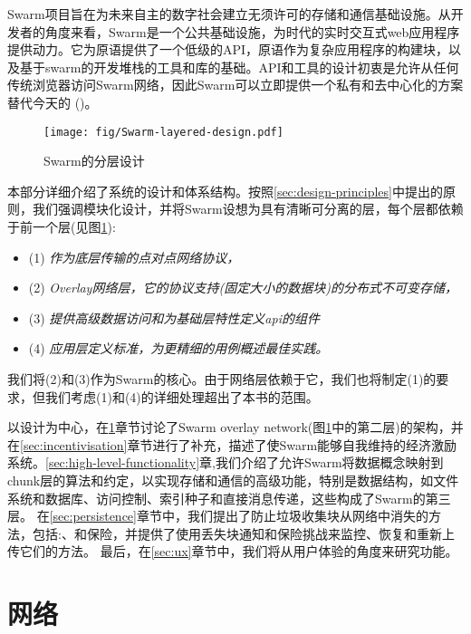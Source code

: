 
\green{}

Swarm项目旨在为未来自主的数字社会建立无须许可的存储和通信基础设施。从开发者的角度来看，Swarm是一个公共基础设施，为时代的实时交互式web应用程序提供动力。它为原语提供了一个低级的API，原语作为复杂应用程序的构建块，以及基于swarm的开发堆栈的工具和库的基础。API和工具的设计初衷是允许从任何传统浏览器访问Swarm网络，因此Swarm可以立即提供一个私有和去中心化的方案替代今天的 ()。

\begin{figure}[htbp]
  \centering
    \texttt{[image: fig/Swarm-layered-design.pdf]}
  \caption[Swarm的分层设计\statusgreen]{Swarm的分层设计}
\label{fig:Swarm-layered-design}
\end{figure}

本部分详细介绍了系统的设计和体系结构。按照\ref{sec:design-principles}中提出的原则，我们强调模块化设计，并将Swarm设想为具有清晰可分离的层，每个层都依赖于前一个层(见图\ref{fig:Swarm-layered-design}):

\begin{itemize}
\item (1) \emph{作为底层传输的点对点网络协议，}
\item (2) \emph{Overlay网络层，它的协议支持(固定大小的数据块)的分布式不可变存储，}
\item (3) \emph{提供高级数据访问和为基础层特性定义api的组件}
\item (4) \emph{应用层定义标准，为更精细的用例概述最佳实践。}
\end{itemize}

我们将(2)和(3)作为Swarm的核心。由于网络层依赖于它，我们也将制定(1)的要求，但我们考虑(1)和(4)的详细处理超出了本书的范围。


以设计为中心，在\ref{sec:network}章节讨论了Swarm overlay network(图\ref{fig:Swarm-layered-design}中的第二层)的架构，并在\ref{sec:incentivisation}章节进行了补充，描述了使Swarm能够自我维持的经济激励系统。\ref{sec:high-level-functionality}章,我们介绍了允许Swarm将数据概念映射到chunk层的算法和约定，以实现存储和通信的高级功能，特别是数据结构，如文件系统和数据库、访问控制、索引种子和直接消息传递，这些构成了Swarm的第三层。
在\ref{sec:persistence}章节中，我们提出了防止垃圾收集块从网络中消失的方法，包括:、和保险，并提供了使用丢失块通知和保险挑战来监控、恢复和重新上传它们的方法。
最后，在\ref{sec:ux}章节中，我们将从用户体验的角度来研究功能。

\chapter{网络}\label{sec:network}

